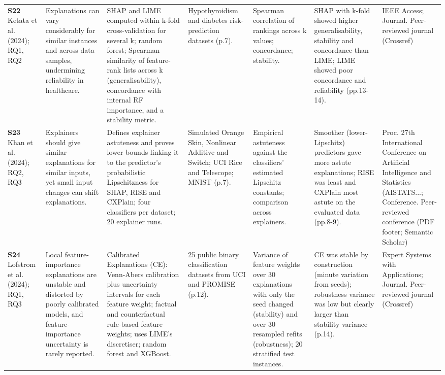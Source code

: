 \begin{longtable}{@{}P{1.55cm}P{2.9cm}P{4.5cm}P{3.2cm}P{3.4cm}P{4.6cm}P{3.6cm}@{}}
\textbf{S22} \cite{S22} Ketata et al. (2024); RQ1, RQ2 & Explanations can vary considerably for similar instances and across data samples, undermining reliability in healthcare. & SHAP and LIME computed within k-fold cross-validation for several k; random forest; Spearman similarity of feature-rank lists across k (generalisability), concordance with internal RF importance, and a stability metric. & Hypothyroidism and diabetes risk-prediction datasets (p.7). & Spearman correlation of rankings across k values; concordance; stability. & SHAP with k-fold showed higher generalisability, stability and concordance than LIME; LIME showed poor concordance and reliability (pp.13-14). & IEEE Access; Journal. Peer-reviewed journal (Crossref) \\
\textbf{S23} \cite{S23} Khan et al. (2024); RQ2, RQ3 & Explainers should give similar explanations for similar inputs, yet small input changes can shift explanations. & Defines explainer astuteness and proves lower bounds linking it to the predictor's probabilistic Lipschitzness for SHAP, RISE and CXPlain; four classifiers per dataset; 20 explainer runs. & Simulated Orange Skin, Nonlinear Additive and Switch; UCI Rice and Telescope; MNIST (p.7). & Empirical astuteness against the classifiers' estimated Lipschitz constants; comparison across explainers. & Smoother (lower-Lipschitz) predictors gave more astute explanations; RISE was least and CXPlain most astute on the evaluated data (pp.8-9). & Proc. 27th International Conference on Artificial Intelligence and Statistics (AISTATS...; Conference. Peer-reviewed conference (PDF footer; Semantic Scholar) \\
\textbf{S24} \cite{S24} Lofstrom et al. (2024); RQ1, RQ3 & Local feature-importance explanations are unstable and distorted by poorly calibrated models, and feature-importance uncertainty is rarely reported. & Calibrated Explanations (CE): Venn-Abers calibration plus uncertainty intervals for each feature weight; factual and counterfactual rule-based feature weights; uses LIME's discretiser; random forest and XGBoost. & 25 public binary classification datasets from UCI and PROMISE (p.12). & Variance of feature weights over 30 explanations with only the seed changed (stability) and over 30 resampled refits (robustness); 20 stratified test instances. & CE was stable by construction (minute variation from seeds); robustness variance was low but clearly larger than stability variance (p.14). & Expert Systems with Applications; Journal. Peer-reviewed journal (Crossref) \\

\end{longtable}
